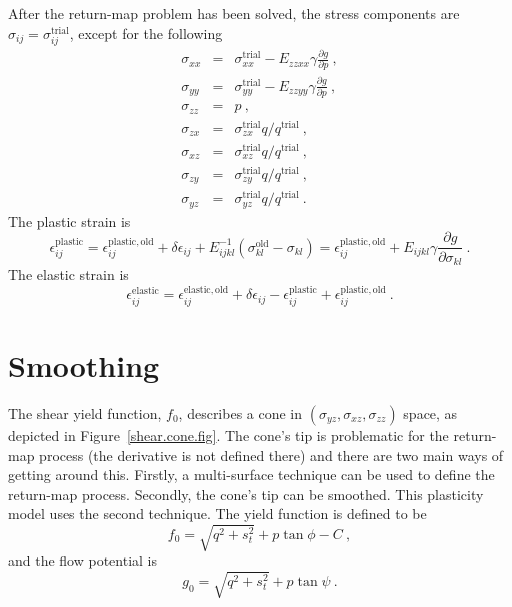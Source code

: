 \documentclass[]{scrreprt}
\newcommand{\ep}{\epsilon}
\begin{document}
After the return-map problem has been solved, the stress components
are $\sigma_{ij} = \sigma_{ij}^{\mathrm{trial}}$, except for the following
\begin{eqnarray}
\sigma_{xx} & = & \sigma_{xx}^{\mathrm{trial}} -
E_{zzxx}\gamma\frac{\partial g}{\partial p} \ , \\
\sigma_{yy} & = & \sigma_{yy}^{\mathrm{trial}} -
E_{zzyy}\gamma\frac{\partial g}{\partial p} \ , \\
\sigma_{zz} & = & p \ , \\
\sigma_{zx} & = & \sigma_{zx}^{\mathrm{trial}} q / q^{\mathrm{trial}}
\ , \label{szx.return.eqn} \\
\sigma_{xz} & = & \sigma_{xz}^{\mathrm{trial}} q / q^{\mathrm{trial}}
\ , \\
\sigma_{zy} & = & \sigma_{zy}^{\mathrm{trial}} q / q^{\mathrm{trial}}
\ ,  \label{szy.return.eqn} \\
\sigma_{yz} & = & \sigma_{yz}^{\mathrm{trial}} q / q^{\mathrm{trial}}
\ .
\end{eqnarray}
The plastic strain is
\begin{equation}
\ep_{ij}^{\mathrm{plastic}} = \ep_{ij}^{\mathrm{plastic, old}} +
\delta\epsilon_{ij} + E_{ijkl}^{-1}(\sigma_{kl}^{\mathrm{old}} -
\sigma_{kl}) = \ep_{ij}^{\mathrm{plastic, old}} + E_{ijkl}\gamma
\frac{\partial g}{\partial \sigma_{kl}}\ .
\end{equation}
The elastic strain is
\begin{equation}
\ep_{ij}^{\mathrm{elastic}} = \ep_{ij}^{\mathrm{elastic, old}} +
\delta\epsilon_{ij} - \ep_{ij}^{\mathrm{plastic}} +
\ep_{ij}^{\mathrm{plastic, old}} \ .
\end{equation}


\chapter{Smoothing}

The shear yield function, $f_{0}$, describes a cone in $(\sigma_{yz},
\sigma_{xz}, \sigma_{zz})$ space, as depicted in
Figure~\ref{shear.cone.fig}.  The cone's tip is problematic for the
return-map process (the derivative is not defined there) and there are
two main ways of getting around this.  Firstly, a multi-surface
technique can be used to define the return-map process.  Secondly, the
cone's tip can be smoothed.  This plasticity model uses the second
technique.  The yield function is defined to be
\begin{equation}
f_{0} = \sqrt{q^{2} + s_{t}^{2}} + p\tan\phi - C \ ,
\end{equation}
and the flow potential is
\begin{equation}
g_{0} = \sqrt{q^{2} + s_{t}^{2}} + p\tan\psi \ .
\end{equation}
\end{document}
